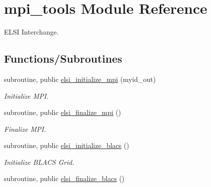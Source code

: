 \hypertarget{namespacempi__tools}{}\section{mpi\+\_\+tools Module Reference}
\label{namespacempi__tools}


E\+L\+S\+I Interchange.  


\subsection*{Functions/\+Subroutines}
\begin{DoxyCompactItemize}
\item 
\hypertarget{namespacempi__tools_a339ffffa5553a6d0cc03bd478c4aad56}{}subroutine, public \hyperlink{namespacempi__tools_a339ffffa5553a6d0cc03bd478c4aad56}{elsi\+\_\+initialize\+\_\+mpi} (myid\+\_\+out)\label{namespacempi__tools_a339ffffa5553a6d0cc03bd478c4aad56}

\begin{DoxyCompactList}\small\item\em Initialize M\+P\+I. \end{DoxyCompactList}\item 
\hypertarget{namespacempi__tools_a64bd78c07c0715573d7517a2a130d609}{}subroutine, public \hyperlink{namespacempi__tools_a64bd78c07c0715573d7517a2a130d609}{elsi\+\_\+finalize\+\_\+mpi} ()\label{namespacempi__tools_a64bd78c07c0715573d7517a2a130d609}

\begin{DoxyCompactList}\small\item\em Finalize M\+P\+I. \end{DoxyCompactList}\item 
\hypertarget{namespacempi__tools_a0ecb8273f1c5b7d1b277874a7964bd1d}{}subroutine, public \hyperlink{namespacempi__tools_a0ecb8273f1c5b7d1b277874a7964bd1d}{elsi\+\_\+initialize\+\_\+blacs} ()\label{namespacempi__tools_a0ecb8273f1c5b7d1b277874a7964bd1d}

\begin{DoxyCompactList}\small\item\em Initialize B\+L\+A\+C\+S Grid. \end{DoxyCompactList}\item 
\hypertarget{namespacempi__tools_a12c0b5f94b66cdc0ef469691eeeb6f7f}{}subroutine, public \hyperlink{namespacempi__tools_a12c0b5f94b66cdc0ef469691eeeb6f7f}{elsi\+\_\+finalize\+\_\+blacs} ()\label{namespacempi__tools_a12c0b5f94b66cdc0ef469691eeeb6f7f}


\end{DoxyCompactItemize}

